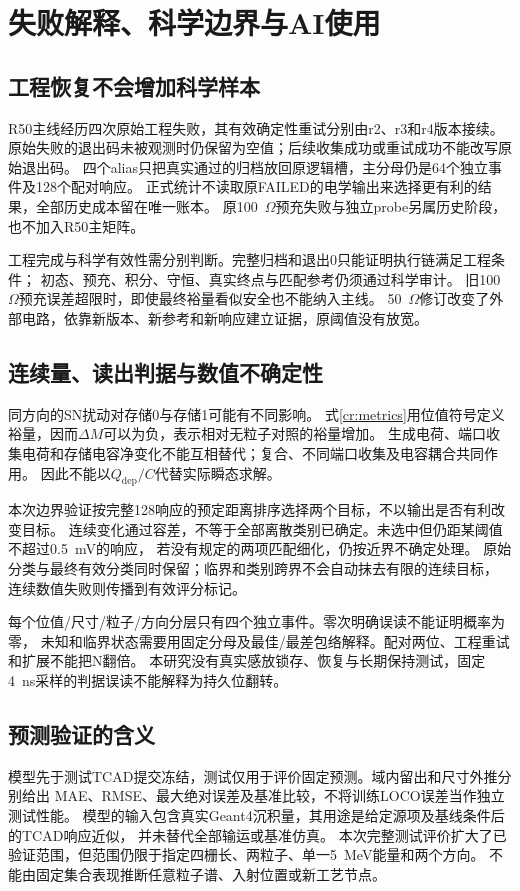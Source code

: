 \section{失败解释、科学边界与AI使用}
\label{cr:discussion}
\subsection{工程恢复不会增加科学样本}
R50主线经历四次原始工程失败，其有效确定性重试分别由r2、r3和r4版本接续。
原始失败的退出码未被观测时仍保留为空值；后续收集成功或重试成功不能改写原始退出码。
四个alias只把真实通过的归档放回原逻辑槽，主分母仍是64个独立事件及128个配对响应。
正式统计不读取原FAILED的电学输出来选择更有利的结果，全部历史成本留在唯一账本。
原100~$\Omega$预充失败与独立probe另属历史阶段，也不加入R50主矩阵。

工程完成与科学有效性需分别判断。完整归档和退出0只能证明执行链满足工程条件；
初态、预充、积分、守恒、真实终点与匹配参考仍须通过科学审计。
旧100~$\Omega$预充误差超限时，即使最终裕量看似安全也不能纳入主线。
50~$\Omega$修订改变了外部电路，依靠新版本、新参考和新响应建立证据，原阈值没有放宽。

\subsection{连续量、读出判据与数值不确定性}
同方向的SN扰动对存储0与存储1可能有不同影响。
式\eqref{cr:metrics}用位值符号定义裕量，因而$\Delta M$可以为负，表示相对无粒子对照的裕量增加。
生成电荷、端口收集电荷和存储电容净变化不能互相替代；复合、不同端口收集及电容耦合共同作用。
因此不能以$Q_{\mathrm{dep}}/C$代替实际瞬态求解。

本次边界验证按完整128响应的预定距离排序选择两个目标，不以输出是否有利改变目标。
连续变化通过容差，不等于全部离散类别已确定。未选中但仍距某阈值不超过0.5~mV的响应，
若没有规定的两项匹配细化，仍按近界不确定处理。
原始分类与最终有效分类同时保留；临界和类别跨界不会自动抹去有限的连续目标，
连续数值失败则传播到有效评分标记。

每个位值/尺寸/粒子/方向分层只有四个独立事件。零次明确误读不能证明概率为零，
未知和临界状态需要用固定分母及最佳/最差包络解释。配对两位、工程重试和扩展不能把N翻倍。
本研究没有真实感放锁存、恢复与长期保持测试，固定4~ns采样的判据误读不能解释为持久位翻转。

\subsection{预测验证的含义}
模型先于测试TCAD提交冻结，测试仅用于评价固定预测。域内留出和尺寸外推分别给出
MAE、RMSE、最大绝对误差及基准比较，不将训练LOCO误差当作独立测试性能。
模型的输入包含真实Geant4沉积量，其用途是给定源项及基线条件后的TCAD响应近似，
并未替代全部输运或基准仿真。
本次完整测试评价扩大了已验证范围，但范围仍限于指定四栅长、两粒子、单一5~MeV能量和两个方向。
不能由固定集合表现推断任意粒子谱、入射位置或新工艺节点。

